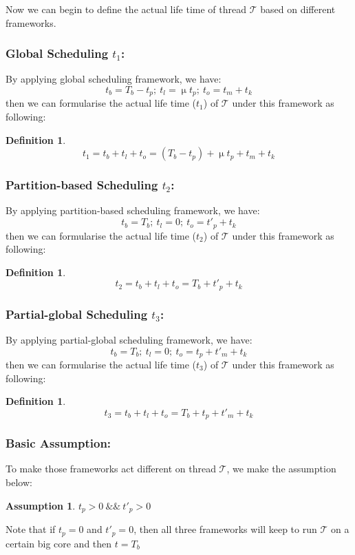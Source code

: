\documentclass[pageno]{jpaper}
\newtheorem{definition}[theorem]{\bf Definition}
\newtheorem{assumption}[theorem]{\bf Assumption}
\begin{document}
Now we can begin to define the actual life time of thread $\mathcal{T}$ based on different frameworks.
\subsubsection{Global Scheduling $t_1$:}
By applying global scheduling framework, we have:
$$ t_b = T_b - t_p;\ t_l = \upmu t_p;\ t_o = t_m + t_k $$
then we can formularise the actual life time  ($t_1$) of $\mathcal{T}$ under this framework as following:
\begin{definition}\label{d1} $$  t_1 =  t_b + t_l + t_o = (T_b - t_p) + \upmu t_p + t_m + t_k $$
\end{definition}

\subsubsection{Partition-based Scheduling $t_2$:}
By applying partition-based scheduling framework, we have:
$$ t_b = T_b;\ t_l = 0 ;\ t_o = t'_p + t_k $$
then we can formularise the actual life time ($t_2$) of $\mathcal{T}$ under this framework as following:
\begin{definition}\label{d2} $$  t_2 =  t_b + t_l + t_o = T_b  + t'_p + t_k $$
\end{definition}

\subsubsection{Partial-global Scheduling $t_3$:}
By applying partial-global scheduling framework, we have:
$$ t_b = T_b;\ t_l = 0;\ t_o = t_p + t'_m + t_k $$
then we can formularise the actual life time ($t_3$) of $\mathcal{T}$ under this framework as following:
\begin{definition}\label{d3} $$  t_3 =  t_b + t_l + t_o = T_b + t_p + t'_m + t_k $$
\end{definition}

\subsubsection{Basic Assumption:}
To make those frameworks act different on thread $\mathcal{T}$, we make the assumption below: 

\begin{assumption} \label{a1} $t_p > 0\ \&\&\ t'_p >0$
\end{assumption}

Note that if $t_p = 0$ and $t'_p = 0$, then all three frameworks will keep to run $\mathcal{T}$ on a certain big core and then $t = T_b$
\end{document}
